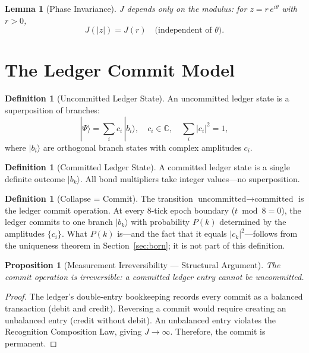 \documentclass[12pt,a4paper]{article}
\newtheorem{lemma}[theorem]{Lemma}
\newtheorem{proposition}[theorem]{Proposition}
\theoremstyle{definition}
\newtheorem{definition}[theorem]{Definition}
\theoremstyle{remark}
\begin{document}
\begin{lemma}[Phase Invariance]
\label{lem:phase}
$J$ depends only on the modulus: for $z = r\,e^{i\theta}$ with
$r > 0$,
\begin{equation}
  J(|z|) = J(r) \quad \text{(independent of $\theta$)}.
\end{equation}
\end{lemma}

\section{The Ledger Commit Model}
\label{sec:commit}

\begin{definition}[Uncommitted Ledger State]
An uncommitted ledger state is a superposition of branches:
\begin{equation}
  |\Psi\rangle = \sum_i c_i\,|b_i\rangle,
  \quad c_i \in \mathbb{C},
  \quad \sum_i |c_i|^2 = 1,
\end{equation}
where $|b_i\rangle$ are orthogonal branch states with complex
amplitudes $c_i$.
\end{definition}

\begin{definition}[Committed Ledger State]
A committed ledger state is a single definite outcome
$|b_k\rangle$.  All bond multipliers take integer values---no
superposition.
\end{definition}

\begin{definition}[Collapse = Commit]
The transition
$\text{uncommitted} \to \text{committed}$ is the ledger commit
operation.  At every 8-tick epoch boundary ($t \bmod 8 = 0$), the
ledger commits to one branch $|b_k\rangle$ with probability $P(k)$
determined by the amplitudes $\{c_i\}$.  What $P(k)$ is---and the
fact that it equals $|c_k|^2$---follows from the uniqueness theorem
in Section~\ref{sec:born}; it is not part of this definition.
\end{definition}

\begin{proposition}[Measurement Irreversibility --- Structural Argument]
\label{prop:irreversible}
The commit operation is irreversible: a committed ledger entry
cannot be uncommitted.
\end{proposition}

\begin{proof}
The ledger's double-entry bookkeeping records every commit as a
balanced transaction (debit and credit).  Reversing a commit would
require creating an unbalanced entry (credit without debit).  An
unbalanced entry violates the Recognition Composition Law, giving
$J \to \infty$.  Therefore, the commit is permanent.
\end{proof}
\end{document}

